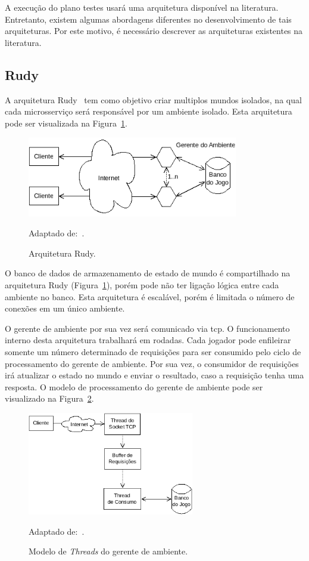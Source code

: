 A execução do plano testes usará uma arquitetura disponível na literatura.
%
Entretanto, existem algumas abordagens diferentes no desenvolvimento de tais arquiteturas.
%
Por este motivo, é necessário descrever as arquiteturas existentes na literatura.



\subsection{Rudy}

A arquitetura Rudy~\cite{matthiasrudy2011} tem como objetivo criar multiplos mundos isolados, na qual cada microsserviço será responsável por um ambiente isolado.
%
Esta arquitetura pode ser visualizada na Figura~\ref{rudy}.


\begin{figure}[htb!]
  \caption{Arquitetura Rudy.}
  \label{rudy}
  \includegraphics[height=3.5cm]{img/cap3/rudy.png}
  \centering

  Adaptado de:~\cite{matthiasrudy2011}.
\end{figure}

O banco de dados de armazenamento de estado de mundo é compartilhado na arquitetura Rudy (Figura~\ref{rudy}), porém pode não ter ligação lógica entre cada ambiente no banco.
%
Esta arquitetura é escalável, porém é limitada o número de conexões em um único ambiente.



O gerente de ambiente por sua vez será comunicado via \ac{tcp}.
%
O funcionamento interno desta arquitetura trabalhará em rodadas.
%
Cada jogador pode enfileirar somente um número determinado de requisições para ser consumido pelo ciclo de processamento do gerente de ambiente.
%
Por sua vez, o consumidor de requisições irá atualizar o estado no mundo e enviar o resultado, caso a requisição tenha uma resposta.
%
O modelo de processamento do gerente de ambiente pode ser visualizado na Figura~\ref{fig:processamento}.



\begin{figure}[htb!]
  \caption{Modelo de \textit{Threads} do gerente de ambiente.}
  \label{fig:processamento}
  \includegraphics[height=4.5cm]{img/cap3/thread_model.png}
  \centering

  Adaptado de:~\cite{matthiasrudy2011}.
\end{figure}

